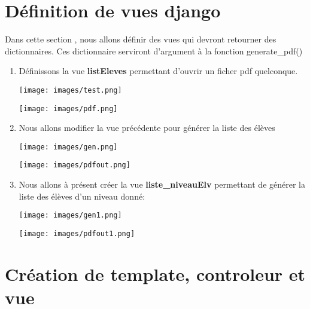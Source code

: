 \documentclass[11pt,a4paper]{article}
\begin{document}
\section{Définition de vues django}
Dans cette section , nous allons définir des vues qui devront retourner des dictionnaires. Ces dictionnaire serviront d'argument à la fonction generate\_pdf()
\begin{enumerate}
	\item Définissons la vue \textbf{listEleves} permettant d'ouvrir un ficher pdf quelconque.
		\begin{center}
		\texttt{[image: images/test.png]}
	\end{center}
			\begin{center}
		\texttt{[image: images/pdf.png]}
	\end{center}
	\item Nous allons modifier la vue précédente pour générer la liste des élèves
	\begin{center}
		\texttt{[image: images/gen.png]}
	\end{center}
	\begin{center}
		\texttt{[image: images/pdfout.png]}
	\end{center}
	\item Nous allons à présent créer la vue \textbf{liste\_niveauElv} permettant de générer la liste des élèves d'un niveau donné:
		\begin{center}
		\texttt{[image: images/gen1.png]}
	\end{center}
	\begin{center}
		\texttt{[image: images/pdfout1.png]}
	\end{center}
\end{enumerate}
\section{Création de template, controleur et vue}
\end{document}
